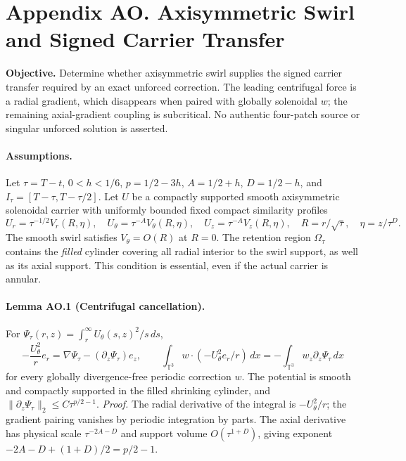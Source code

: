 \clearpage
\section*{Appendix AO. Axisymmetric Swirl and Signed Carrier Transfer}
\noindent\textbf{Objective.} Determine whether axisymmetric swirl supplies the signed carrier transfer required by an exact unforced correction. The leading centrifugal force is a radial gradient, which disappears when paired with globally solenoidal $w$; the remaining axial-gradient coupling is subcritical. No authentic four-patch source or singular unforced solution is asserted.

\paragraph{Assumptions.}
Let $\tau=T-t$, $0<h<1/6$, $p=1/2-3h$, $A=1/2+h$, $D=1/2-h$, and $I_\tau=[T-\tau,T-\tau/2]$. Let $U$ be a compactly supported smooth axisymmetric solenoidal carrier with uniformly bounded fixed compact similarity profiles
\[
U_r=\tau^{-1/2}V_r(R,\eta),\quad U_\theta=\tau^{-A}V_\theta(R,\eta),\quad U_z=\tau^{-A}V_z(R,\eta),\quad R=r/\sqrt\tau,\quad\eta=z/\tau^D.
\]
The smooth swirl satisfies $V_\theta=O(R)$ at $R=0$. The retention region $\Omega_\tau$ contains the \emph{filled} cylinder covering all radial interior to the swirl support, as well as its axial support. This condition is essential, even if the actual carrier is annular.

\paragraph{Lemma AO.1 (Centrifugal cancellation).}
For
$\Psi_\tau(r,z)=\int_r^\infty U_\theta(s,z)^2/s\,ds$,
\[
-\frac{U_\theta^2}{r}e_r=\nabla\Psi_\tau-(\partial_z\Psi_\tau)e_z,
\qquad
\boxed{\int_{\mathbb T^3}w\cdot(-U_\theta^2e_r/r)\,dx
=-\int_{\mathbb T^3}w_z\partial_z\Psi_\tau\,dx}
\]
for every globally divergence-free periodic correction $w$. The potential is smooth and compactly supported in the filled shrinking cylinder, and
$\|\partial_z\Psi_\tau\|_2\le C\tau^{p/2-1}$.
\emph{Proof.} The radial derivative of the integral is $-U_\theta^2/r$; the gradient pairing vanishes by periodic integration by parts. The axial derivative has physical scale $\tau^{-2A-D}$ and support volume $O(\tau^{1+D})$, giving exponent $-2A-D+(1+D)/2=p/2-1$.

